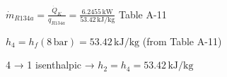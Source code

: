 \( \dot{m}_{R134a} = \frac{\dot{Q}_K}{q_{R134a}} = \frac{6.2455 \, \text{kW}}{53.42 \, \text{kJ/kg}} \)  
Table A-11  

\( h_4 = h_{f} (8 \, \text{bar}) = 53.42 \, \text{kJ/kg} \) (from Table A-11)  

4 → 1 isenthalpic → \( h_2 = h_4 = 53.42 \, \text{kJ/kg} \)